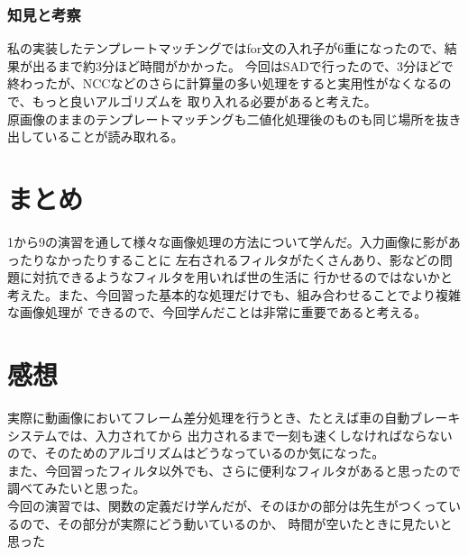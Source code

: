 ﻿\documentclass[a4j,11pt]{jarticle}
\begin{document}
\subsubsection{知見と考察}
私の実装したテンプレートマッチングではfor文の入れ子が6重になったので、結果が出るまで約3分ほど時間がかかった。
今回はSADで行ったので、3分ほどで終わったが、NCCなどのさらに計算量の多い処理をすると実用性がなくなるので、もっと良いアルゴリズムを
取り入れる必要があると考えた。\\
原画像のままのテンプレートマッチングも二値化処理後のものも同じ場所を抜き出していることが読み取れる。
%

%
\section{まとめ}
%
%
1から9の演習を通して様々な画像処理の方法について学んだ。入力画像に影があったりなかったりすることに
左右されるフィルタがたくさんあり、影などの問題に対抗できるようなフィルタを用いれば世の生活に
行かせるのではないかと考えた。また、今回習った基本的な処理だけでも、組み合わせることでより複雑な画像処理が
できるので、今回学んだことは非常に重要であると考える。
%

%
%
\section{感想}
%
%
実際に動画像においてフレーム差分処理を行うとき、たとえば車の自動ブレーキシステムでは、入力されてから
出力されるまで一刻も速くしなければならないので、そのためのアルゴリズムはどうなっているのか気になった。\\
また、今回習ったフィルタ以外でも、さらに便利なフィルタがあると思ったので調べてみたいと思った。\\
今回の演習では、関数の定義だけ学んだが、そのほかの部分は先生がつくっているので、その部分が実際にどう動いているのか、
時間が空いたときに見たいと思った

%
%
\end{document}
